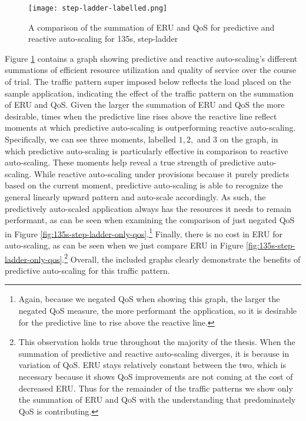 \begin{figure}[!h]
  \centerline{\texttt{[image: step-ladder-labelled.png]}}
  \caption{A comparison of the summation of ERU and QoS for
    predictive and reactive auto-scaling for 135s, step-ladder}
  \label{fig:135s-step-ladder-labelled}
\end{figure}


Figure \ref{fig:135s-step-ladder-labelled} contains a graph
showing predictive and reactive auto-scaling's different
summations of efficient resource utilization and quality of service over the
course of trial. The traffic pattern super imposed below reflects the load
placed on the sample application, indicating the effect of the traffic pattern
on the summation of ERU and QoS. Given the larger the summation of ERU and QoS
the more desirable, times when the predictive line rises above the reactive line
reflect moments at which predictive auto-scaling is outperforming reactive
auto-scaling. Specifically, we can see three moments, labelled $1, 2,$ and
$3$ on the graph, in which predictive auto-scaling is particularly effective in
comparison to reactive auto-scaling. These moments help reveal a true strength of
predictive auto-scaling. While reactive auto-scaling under provisions because it
purely predicts based on the current moment, predictive auto-scaling is able to
recognize the general linearly upward pattern and auto-scale accordingly. As
such, the predictively auto-scaled application always has the resources it needs
to remain performant, as can be seen when examining the comparison of just
negated QoS in Figure \ref{fig:135s-step-ladder-only-qos}.\footnote{Again,
because we negated QoS when showing this graph, the larger the negated QoS
measure, the more performant the application, so it is desirable for the
predictive line to rise above the reactive line.} Finally, there is no cost in
ERU for auto-scaling, as can be seen when we just compare ERU in Figure
\ref{fig:135s-step-ladder-only-qos}.\footnote{This observation holds true
throughout the majority of the thesis. When the summation of predictive and
reactive auto-scaling diverges, it is because in variation of QoS. ERU stays
relatively constant between the two, which is necessary because it shows QoS
improvements are not coming at the cost of decreased ERU.
Thus for the remainder of the traffic
patterns we show only the summation of ERU and QoS with the understanding that
predominately QoS is contributing.} Overall, the included graphs clearly
demonstrate the benefits of predictive auto-scaling for this traffic pattern.

